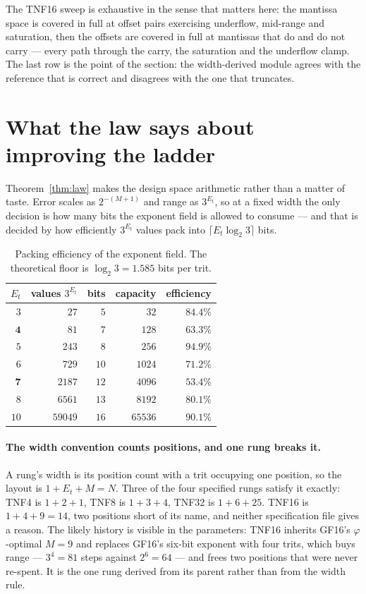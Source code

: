 \documentclass[11pt]{article}
\theoremstyle{definition}
\begin{document}
The TNF16 sweep is exhaustive in the sense that matters here: the mantissa space
is covered in full at offset pairs exercising underflow, mid-range and
saturation, then the offsets are covered in full at mantissas that do and do not
carry --- every path through the carry, the saturation and the underflow clamp.
The last row is the point of the section: the width-derived module agrees with
the reference that is correct and disagrees with the one that truncates.


\section{What the law says about improving the ladder}\label{sec:design}

Theorem~\ref{thm:law} makes the design space arithmetic rather than a matter of
taste. Error scales as $2^{-(M+1)}$ and range as $3^{E_t}$, so at a fixed width
the only decision is how many bits the exponent field is allowed to consume ---
and that is decided by how efficiently $3^{E_t}$ values pack into
$\lceil E_t \log_2 3\rceil$ bits.

\begin{table}[t]\centering
\caption{Packing efficiency of the exponent field. The theoretical floor is
$\log_2 3 = 1.585$ bits per trit.}
\label{tab:pack}
\begin{tabular}{rrrrr}
\toprule
$E_t$ & values $3^{E_t}$ & bits & capacity & efficiency \\
\midrule
$3$  & $27$    & $5$  & $32$   & $84.4\%$ \\
$\mathbf{4}$  & $81$    & $7$  & $128$  & $\mathbf{63.3\%}$ \\
$5$  & $243$   & $8$  & $256$  & $\mathbf{94.9\%}$ \\
$6$  & $729$   & $10$ & $1024$ & $71.2\%$ \\
$\mathbf{7}$  & $2187$  & $12$ & $4096$ & $\mathbf{53.4\%}$ \\
$8$  & $6561$  & $13$ & $8192$ & $80.1\%$ \\
$10$ & $59049$ & $16$ & $65536$ & $90.1\%$ \\
\bottomrule
\end{tabular}
\end{table}

\paragraph{The width convention counts positions, and one rung breaks it.}
A rung's width is its position count with a trit occupying one position, so the
layout is $1 + E_t + M = N$. Three of the four specified rungs satisfy it exactly:
TNF4 is $1+2+1$, TNF8 is $1+3+4$, TNF32 is $1+6+25$. TNF16 is
$1+4+9 = 14$, two positions short of its name, and neither specification file
gives a reason. The likely history is visible in the parameters: TNF16 inherits
GF16's $\varphi$-optimal $M = 9$ and replaces GF16's six-bit exponent with four
trits, which buys range --- $3^4 = 81$ steps against $2^6 = 64$ --- and frees two
positions that were never re-spent. It is the one rung derived from its parent
rather than from the width rule.
\end{document}
